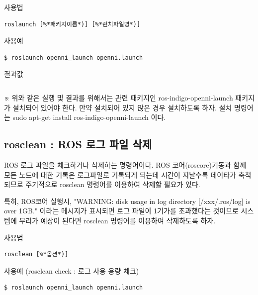 \setcounter{num}{0}

\vspace{\baselineskip}
\noindent
{}\circled{\thenum} 사용법
\begin{lstlisting}[language=ROS]
roslaunch [%*패키지이름*)] [%*런치파일명*)]
\end{lstlisting}

\noindent
{}\circled{\thenum} 사용예
\begin{lstlisting}[language=ROS]
$ roslaunch openni_launch openni.launch 
\end{lstlisting}

\noindent
{}\circled{\thenum} 결과값
\begin{lstlisting}[language=ROS]
%*생략*)
\end{lstlisting}

\noindent
※ 위와 같은 실행 및 결과를 위해서는 관련 패키지인 ros-indigo-openni-launch 패키지가 설치되어 있어야 한다. 만약 설치되어 있지 않은 경우 설치하도록 하자. 설치 명령어는 sudo apt-get install ros-indigo-openni-launch  이다.

\newpage
\subsection{rosclean : ROS 로그 파일 삭제}

ROS 로그 파일을 체크하거나 삭제하는 명령어이다. ROS 코어(roscore)기동과 함께 모든 노드에 대한 기록은 로그파일로 기록되게 되는데 시간이 지날수록 데이타가 축척되므로 주기적으로 rosclean 명령어를 이용하여 삭제할 필요가 있다.

특히, ROS코어 실행시, "WARNING: disk usage in log directory [/xxx/.ros/log] is over 1GB." 이라는 메시지가 표시되면 로그 파일이 1기가를 초과했다는 것이므로 시스템에 무리가 예상이 된다면 rosclean 명령어를 이용하여 삭제하도록 하자.

\setcounter{num}{0}

\vspace{\baselineskip}
\noindent
{}\circled{\thenum} 사용법
\begin{lstlisting}[language=ROS]
rosclean [%*옵션*)]
\end{lstlisting}

\noindent
{}\circled{\thenum} 사용예 (rosclean check : 로그 사용 용량 체크)
\begin{lstlisting}[language=ROS]
$ roslaunch openni_launch openni.launch 
\end{lstlisting}

